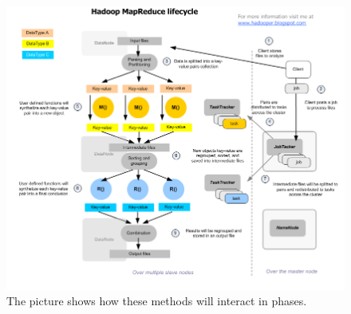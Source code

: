 \begin{figure}
\caption{The picture shows how these methods will interact in phases.}
\label{tab:hadoop_map_reduce_cycle}
\centering
\includegraphics[scale=.33]{./img/HadoopMapReduceArchitecture.png}
\end{figure}

